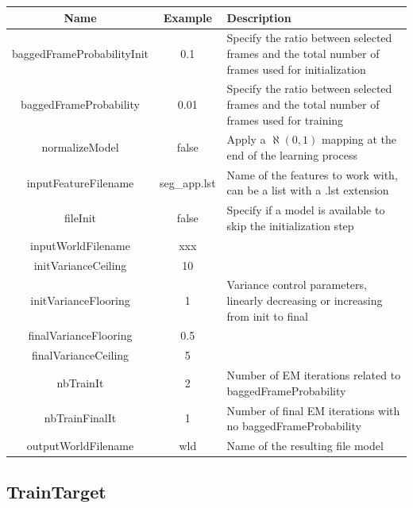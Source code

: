 \documentclass[a4paper]{article}
\begin{document}
\begin{tabular}{|c|c||p{8cm}|}
\hline Name & Example & Description\\
\hline
\hline baggedFrameProbabilityInit & 0.1 & Specify the ratio between selected frames and the total number of frames used for initialization\\
\hline baggedFrameProbability & 0.01 & Specify the ratio between selected frames and the total number of frames used for training\\
\hline normalizeModel & false & Apply a $\aleph(0,1)$ mapping at the end of the learning process\\
\hline inputFeatureFilename & seg\_app.lst & Name of the features to work with, can be a list with a .lst extension\\
\hline fileInit & false & Specify if a model is available to skip the initialization step\\
\cline{1-2} inputWorldFilename  & xxx & \\
\hline initVarianceCeiling & 10 &\\
\cline{1-2} initVarianceFlooring & 1 & Variance control parameters, linearly decreasing or increasing from init to final\\
\cline{1-2} finalVarianceFlooring & 0.5 &\\
\cline{1-2} finalVarianceCeiling & 5 & \\
\hline nbTrainIt & 2 & Number of EM iterations related to baggedFrameProbability\\
\hline nbTrainFinalIt & 1 & Number of final EM iterations with no baggedFrameProbability\\
\hline outputWorldFilename & wld & Name of the resulting file model\\
\hline
\end{tabular}

\subsection{TrainTarget}
\end{document}
